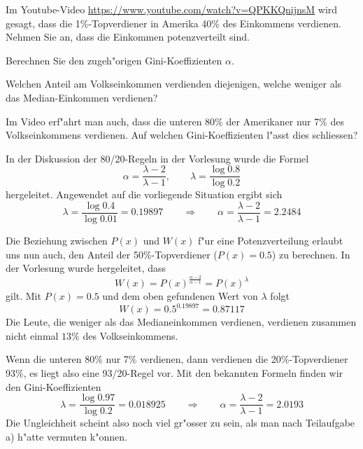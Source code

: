 Im Youtube-Video \url{https://www.youtube.com/watch?v=QPKKQnijnsM} wird
gesagt, dass die 1\%-Topverdiener in Amerika 40\% des Einkommens
verdienen. Nehmen Sie an, dass die Einkommen potenzverteilt sind.
\begin{teilaufgaben}
\item
Berechnen Sie den zugeh"origen Gini-Koeffizienten $\alpha$.
\item
Welchen Anteil am Volkseinkommen verdienden diejenigen, welche
weniger als das Median-Einkommen verdienen?
\item
Im Video erf"ahrt man auch, dass die unteren 80\% der Amerikaner nur
7\% des Volkseinkommens verdienen. 
Auf welchen Gini-Koeffizienten l"asst dies schliessen?
\end{teilaufgaben}

\begin{loesung}
\begin{teilaufgaben}
\item
In der Diskussion der 80/20-Regeln in der Vorlesung wurde die Formel
\[
\alpha=\frac{\lambda-2}{\lambda-1},\qquad \lambda=\frac{\log 0.8}{\log 0.2}
\]
hergeleitet. Angewendet auf die vorliegende Situation ergibt sich
\[
\lambda=\frac{\log 0.4}{\log 0.01}=0.19897
\qquad
\Rightarrow
\qquad
\alpha=\frac{\lambda - 2}{\lambda - 1}=2.2484
\]
\item
Die Beziehung zwischen $P(x)$ und $W(x)$ f"ur eine Potenzverteilung erlaubt
uns nun auch, den Anteil der 50\%-Topverdiener ($P(x)=0.5$) zu berechnen.
In der Vorlesung wurde hergeleitet, dass 
\[
W(x)=P(x)^\frac{\alpha - 2}{\alpha - 1}=P(x)^\lambda
\]
gilt. Mit $P(x)=0.5$ und dem oben gefundenen Wert von $\lambda$
folgt
\[
W(x)=0.5^{0.19897}=0.87117
\]
Die Leute, die weniger als das Medianeinkommen verdienen, verdienen zusammen
nicht einmal $13\%$ des Volkseinkommens.
\item
Wenn die unteren 80\% nur 7\% verdienen, dann verdienen die 20\%-Topverdiener
93\%, es liegt also eine 93/20-Regel vor. Mit den bekannten Formeln finden
wir den Gini-Koeffizienten
\[
\lambda=\frac{\log 0.97}{\log 0.2}=0.018925
\qquad\Rightarrow\qquad
\alpha=\frac{\lambda - 2}{\lambda - 1}=2.0193
\]
Die Ungleichheit scheint also noch viel gr"osser zu sein, als
man nach Teilaufgabe a) h"atte vermuten k"onnen.
\end{teilaufgaben}
\end{loesung}

